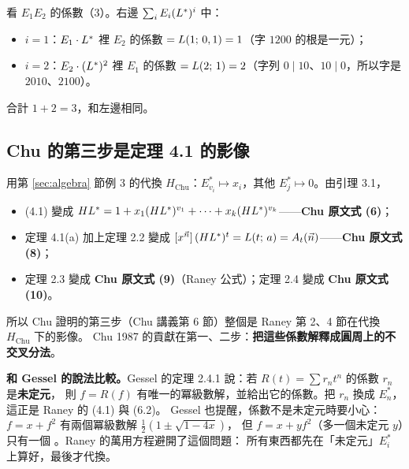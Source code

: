 \begin{exbox}[驗算 (4.1) 的一個係數]
看 $E_1E_2$ 的係數（3）。右邊 $\sum_iE_i(L^{*})^i$ 中：
\begin{itemize}[leftmargin=1.2em]
  \item $i=1$：$E_1\cdot L^{*}$ 裡 $E_2$ 的係數 $=L(1;\,0,1)=1$（字 $1200$ 的根是一元）；
  \item $i=2$：$E_2\cdot(L^{*})^2$ 裡 $E_1$ 的係數 $=L(2;\,1)=2$（字列 $0\mid10$、$10\mid0$，所以字是 $2010$、$2100$）。
\end{itemize}
合計 $1+2=3$，和左邊相同。
\end{exbox}

\subsection{Chu 的第三步是定理 4.1 的影像}

\begin{keybox}[把 $E^*_{v_i}$ 換成 $x_i$ \extra]
用第 \ref{sec:algebra} 節例 3 的代換 $H_{\mathrm{Chu}}$：$E^*_{v_i}\mapsto x_i$，其他 $E_j^*\mapsto0$。由引理 3.1，
\begin{itemize}[leftmargin=1.4em]
  \item (4.1) 變成 $HL^{*}=1+x_1(HL^{*})^{v_1}+\cdots+x_k(HL^{*})^{v_k}$——\textbf{Chu 原文式 (6)}；
  \item 定理 4.1(a) 加上定理 2.2 變成 $[x^{\vec n}]\,(HL^{*})^t=L(t;\,a)=A_t(\vec n)$——\textbf{Chu 原文式 (8)}；
  \item 定理 2.3 變成 \textbf{Chu 原文式 (9)}（Raney 公式）；定理 2.4 變成 \textbf{Chu 原文式 (10)}。
\end{itemize}
所以 Chu 證明的第三步（Chu 講義第 6 節）整個是 Raney 第 2、4 節在代換 $H_{\mathrm{Chu}}$ 下的影像。
Chu 1987 的貢獻在第一、二步：\textbf{把這些係數解釋成圓周上的不交叉分法}。
\end{keybox}

\textbf{和 Gessel 的說法比較。}Gessel 的定理 2.4.1  說：若 $R(t)=\sum r_nt^n$ 的係數 $r_n$ 是\textbf{未定元}，
則 $f=R(f)$ 有唯一的冪級數解，並給出它的係數。把 $r_n$ 換成 $E_n^*$，這正是 Raney 的 (4.1) 與 (6.2)。
Gessel 也提醒，係數不是未定元時要小心：$f=x+f^2$ 有兩個冪級數解 $\frac12(1\pm\sqrt{1-4x})$，
但 $f=x+yf^2$（多一個未定元 $y$）只有一個 。Raney 的萬用方程避開了這個問題：
所有東西都先在「未定元」$E_i^*$ 上算好，最後才代換。
